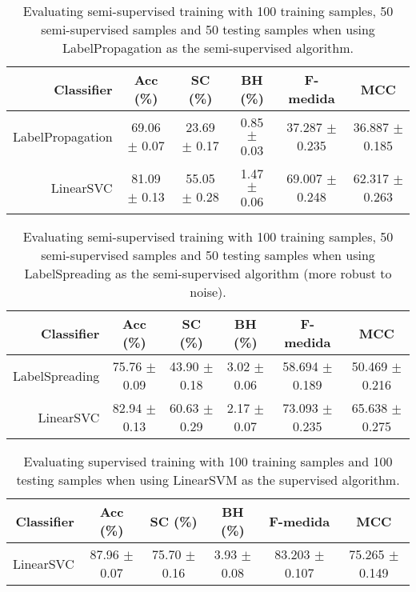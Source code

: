 \begin{table}[!htb]
\footnotesize
\centering
\caption{Evaluating semi-supervised training with 100 training samples, 50 semi-supervised samples and 50 testing samples when using LabelPropagation as the semi-supervised algorithm.}
\label{tab:label-propagation}
\begin{tabular}{r|c|c|c|c|c} \hline\hline
Classifier & Acc (\%) & SC (\%) & BH (\%) & F-medida & MCC \\ \hline
LabelPropagation & 69.06 $\pm$ 0.07 & 23.69 $\pm$ 0.17 & 0.85 $\pm$ 0.03 & 37.287 $\pm$ 0.235 & 36.887 $\pm$ 0.185 \\
LinearSVC & 81.09 $\pm$ 0.13 & 55.05 $\pm$ 0.28 & 1.47 $\pm$ 0.06 & 69.007 $\pm$ 0.248 & 62.317 $\pm$ 0.263 \\
\hline\hline
\end{tabular}
\end{table}
\begin{table}[!htb]
\footnotesize
\centering
\caption{Evaluating semi-supervised training with 100 training samples, 50 semi-supervised samples and 50 testing samples when using LabelSpreading as the semi-supervised algorithm (more robust to noise).}
\label{tab:label-spreading}
\begin{tabular}{r|c|c|c|c|c} \hline\hline
Classifier & Acc (\%) & SC (\%) & BH (\%) & F-medida & MCC \\ \hline
LabelSpreading & 75.76 $\pm$ 0.09 & 43.90 $\pm$ 0.18 & 3.02 $\pm$ 0.06 & 58.694 $\pm$ 0.189 & 50.469 $\pm$ 0.216 \\
LinearSVC & 82.94 $\pm$ 0.13 & 60.63 $\pm$ 0.29 & 2.17 $\pm$ 0.07 & 73.093 $\pm$ 0.235 & 65.638 $\pm$ 0.275 \\
\hline\hline
\end{tabular}
\end{table}
\begin{table}[!htb]
\footnotesize
\centering
\caption{Evaluating supervised training with 100 training samples and 100 testing samples when using LinearSVM as the supervised algorithm.}
\label{tab:linear-svm}
\begin{tabular}{r|c|c|c|c|c} \hline\hline
Classifier & Acc (\%) & SC (\%) & BH (\%) & F-medida & MCC \\ \hline
LinearSVC & 87.96 $\pm$ 0.07 & 75.70 $\pm$ 0.16 & 3.93 $\pm$ 0.08 & 83.203 $\pm$ 0.107 & 75.265 $\pm$ 0.149 \\
\hline\hline
\end{tabular}
\end{table}
